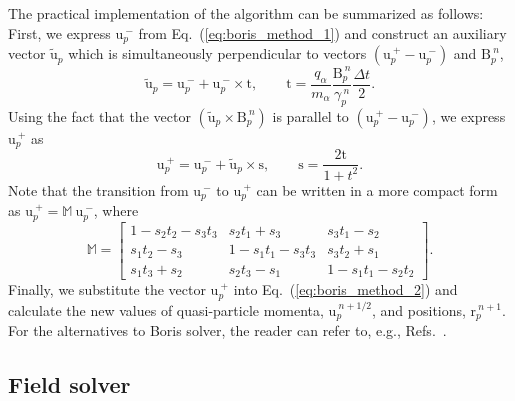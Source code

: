 \documentclass[10pt, a4paper, twoside, openright]{report}
\renewcommand{\vec}[1]{\boldsymbol{\mathrm{#1}}}
\begin{document}
The practical implementation of the algorithm can be summarized as follows: First, we express $ \vec{u}_{p}^{\:-} $ from Eq.~(\ref{eq:boris_method_1}) and construct an auxiliary vector $ \tilde{\vec{u}}_{p} $ which is simultaneously perpendicular to vectors $ \left(\vec{u}_{p}^{\:+} - \vec{u}_{p}^{\:-} \right) $ and $ \vec{B}_{p}^{\:n} $,
\begin{equation}
	\tilde{\vec{u}}_{p} = \vec{u}_{p}^{\:-} + \vec{u}_{p}^{\:-} \times \vec{t}, \qquad \vec{t} = \frac{q_{\alpha}}{m_{\alpha}} \frac{\vec{B}_p^{\:n}}{\gamma_p^{\:n}} \frac{\Delta t}{2}.
\end{equation}
Using the fact that the vector $ (\tilde{\vec{u}}_{p} \times \vec{B}_{p}^{\:n}) $ is parallel to $ \left(\vec{u}_{p}^{\:+} - \vec{u}_{p}^{\:-} \right) $, we express $ \vec{u}_{p}^{\:+} $ as
\begin{equation}
	\vec{u}_{p}^{\:+} = \vec{u}_{p}^{\:-} + \tilde{\vec{u}}_{p} \times \vec{s}, \qquad \vec{s} = \frac{2\vec{t}}{1 + t^2}.
\end{equation}
Note that the transition from $ \vec{u}_{p}^{\:-} $ to $ \vec{u}_{p}^{\:+} $ can be written in a more compact form as $ \vec{u}_{p}^{\:+} = \mathbb{M} \: \vec{u}_{p}^{\:-} $, where
\begin{equation}
	\mathbb{M} = 
	\begin{bmatrix}
		1 - s_{2}t_{2} - s_{3}t_{3} & s_{2}t_{1} + s_{3} & s_{3}t_{1} - s_{2} \\
		s_{1}t_{2} - s_{3} & 1 - s_{1}t_{1} - s_{3}t_{3} & s_{3}t_{2} + s_{1} \\
		s_{1}t_{3} + s_{2} & s_{2}t_{3} - s_{1} & 1 - s_{1}t_{1} - s_{2}t_{2}
	\end{bmatrix}.
\end{equation}
Finally, we substitute the vector $ \vec{u}_{p}^{\:+} $ into Eq.~(\ref{eq:boris_method_2}) and calculate the new values of quasi-particle momenta, $ \vec{u}_{p}^{\:n+1/2} $, and positions, $ \vec{r}_{p}^{\:n+1} $. For the alternatives to Boris solver, the reader can refer to, e.g., Refs.~.

\subsection{Field solver}
\end{document}
